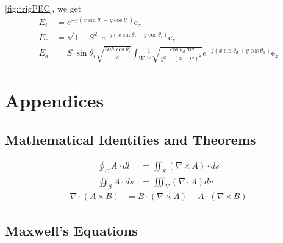 \documentclass{article}
\numberwithin{equation}{section}
\begin{document}
            \ref{fig:trigPEC}, we get
            \begin{subequations}
                \begin{align}
                    E_i &= e^{-j(x \sin \theta_i - y \cos \theta_i)} \text{e}_z \\
                    E_r &= \sqrt{1 - S^{2}} \ e^{-j(x \sin \theta_i + y \cos \theta_i)}
                        \text{e}_z \\
                    E_d &= S \ \sin \theta_i \sqrt{\frac{60h \cos \theta_i}{\pi}} \int_W \frac{1}{w} \sqrt{\frac{ \cos \theta_d \ dw }{y^{2} + (x - w)^{2} }}
                    e^{-j(x \sin \theta_d + y \cos \theta_d)} \text{e}_z
                \end{align}
            \end{subequations}
    \newpage
    \renewcommand{\thesubsection}{\Alph{subsection}}
    \appendix
    \section*{Appendices}
    \subsection{Mathematical Identities and Theorems}
        \begin{subequations} \label{eq:integralVectorTheorems}
            \begin{align}
                \oint_C A \cdot dl &= \iint_S (\nabla \times A) \cdot ds
                    \label{eq:stokes} \\
                \oiint_S A \cdot ds &= \iiint_V (\nabla \cdot A) dv \label{eq:divergence}
            \end{align}
        \end{subequations}
        \begin{subequations} \label{eq:vectorDifferentialIdentities}
            \begin{align}
                \nabla \cdot (A \times B) &= B \cdot (\nabla \times A) - A \cdot (\nabla
                    \times B) \label{eq:divOfCurlOfProduct}
            \end{align}
        \end{subequations}
        \newpage
    \subsection{Maxwell's Equations}
\end{document}
